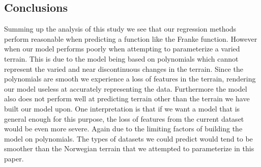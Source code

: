 \documentclass[%
 reprint,
nofootinbib,
 amsmath,amssymb,
 aps,
]{revtex4-2}
\begin{document}
\subsection{Conclusions}

Summing up the analysis of this study we see that our regression methods perform reasonable when predicting a function like the Franke function. However when our model performs poorly when attempting to parameterize a varied terrain. This is due to the model being based on polynomials which cannot represent the varied and near discontinuous changes in the terrain. Since the polynomials are smooth we experience a loss of features in the terrain, rendering our model useless at accurately representing the data. Furthermore the model also does not perform well at predicting terrain other than the terrain we have built our model upon. One interpretation is that if we want a model that is general enough for this purpose, the loss of features from the current dataset would be even more severe. Again due to the limiting factors of building the model on polynomials. The types of datasets we could predict would tend to be smoother than the Norwegian terrain that we attempted to parameterize in this paper.




\end{document}
